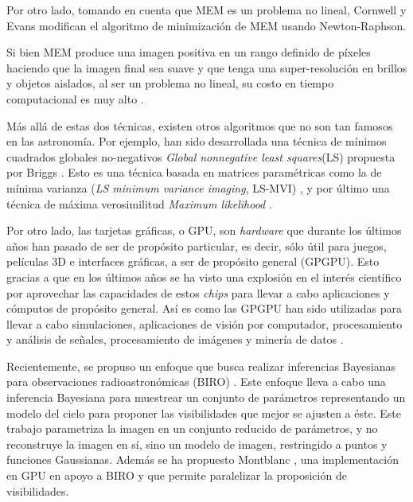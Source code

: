 Por otro lado, tomando en cuenta que MEM es un problema no lineal, Cornwell y Evans \cite{smemda} modifican el algoritmo de minimización de MEM usando Newton-Raphson.

Si bien MEM produce una imagen positiva en un rango definido de píxeles haciendo que la imagen final sea suave y que tenga una super-resolución en brillos y objetos aislados, al ser un problema no lineal, su costo en tiempo computacional es muy alto \cite{libroAstro2}.




Más allá de estas dos técnicas, existen otros algoritmos que no son tan famosos en las astronomía. Por ejemplo, han sido desarrollada una técnica de mínimos cuadrados globales no-negativos \textit{Global nonnegative least squares}(LS) propuesta por Briggs \cite{briggs1995}. Esto es una técnica basada en matrices paramétricas como la de mínima varianza (\textit{LS minimum variance imaging}, LS-MVI) \cite{Lesheradioastronomical}, y por último una técnica de máxima verosimilitud \textit{Maximum likelihood} \cite{BenDavid:2008ff}.

Por otro lado, las tarjetas gráficas, o GPU, son \textit{hardware} que durante los últimos años han pasado de ser de propósito particular, es decir, sólo útil para juegos, películas 3D e interfaces gráficas, a ser de propósito general (GPGPU). Esto gracias a que en los últimos años se ha visto una explosión en el interés científico por aprovechar las capacidades de estos \textit{chips} para llevar a cabo aplicaciones y cómputos de propósito general. Así es como las GPGPU han sido utilizadas para llevar a cabo simulaciones, aplicaciones de visión por computador, procesamiento y análisis de señales, procesamiento de imágenes y minería de datos \cite{Owens:2007:ASO}.


Recientemente, se propuso un enfoque que busca realizar inferencias Bayesianas para observaciones radioastronómicas (BIRO) \cite{BIRO}. Este enfoque lleva a cabo una inferencia Bayesiana para muestrear un conjunto de parámetros representando un modelo del cielo para proponer las visibilidades que mejor se ajusten a éste. Este trabajo parametriza la imagen en un conjunto reducido de parámetros, y no reconstruye la imagen en sí, sino un modelo de imagen, restringido a puntos y funciones Gaussianas. Además se ha propuesto Montblanc \cite{montblanc}, una implementación en GPU en apoyo a BIRO y que permite paralelizar la proposición de visibilidades.

